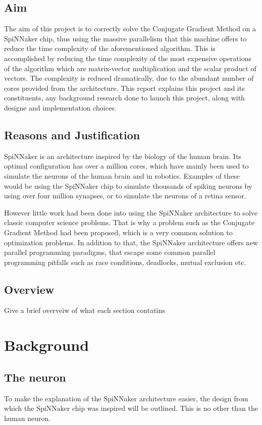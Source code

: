 \documentclass[12pt,a4paper]{article}
\begin{document}
\subsection{Aim}
The aim of this project is to correctly solve the Conjugate Gradient Method\cite{hestenes1952methods} on a SpiNNaker chip, thus using the massive parallelism that this machine offers to reduce the time complexity of the aforementioned algorithm. This is accomplished by reducing the time complexity of the most expensive operations of the algorithm which are matrix-vector multiplication and the scalar product of vectors. The complexity is reduced dramatically, due to the abundant number of cores provided from the architecture. This report explains this project and its constituents, any background research done to launch this project, along with designe and implementation choices.
\subsection{Reasons and Justification}
\indent
SpiNNaker is an architecture inspired by the biology of the human brain. Its optimal configuration has over a million cores\cite{navaridas2009understanding}, which have mainly been used to simulate the neurons of the human brain and in robotics. Examples of these would be using the SpiNNaker chip to simulate thousands of spiking neurons by using over four million synapses\cite{sharp2012power}, or to simulate the neurons of a retina sensor\cite{davies2010interfacing}.

However little work had been done into using the SpiNNaker architecture to solve classic computer science problems. That is why a problem such as the Conjugate Gradient Method had been proposed, which is a very common solution to optimization problems. In addition to that, the SpiNNaker architecture offers new parallel programming paradigms, that escape some common parallel programming pitfalls such as race conditions, deadlocks, mutual exclusion etc\cite{sharp2011event}.
\subsection{Overview}
Give a brief overveiw of what each section contatins
\newpage
\section{Background}
\subsection{The neuron}
To make the explanation of the SpiNNaker architecture easier, the design from which the SpiNNaker chip was inspired will be outlined. This is no other than the human neuron.
\end{document}
